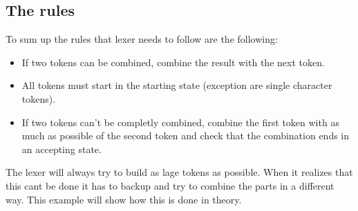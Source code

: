 \subsection{The rules}
To sum up the rules that lexer needs to follow are the following:
\begin{itemize}
\item If two tokens can be combined, combine the result with the next token.
\item All tokens must start in the starting state (exception are single
character tokens).
\item If two tokens can't be completly combined, combine the first token with as
much as possible of the second token and check that the combination ends in an
accepting state.
\end{itemize}
\newpage
\begin{example}
The lexer will always try to build as lage tokens as possible. When it realizes that this cant be done it has to backup and try to combine the parts in a different way. This example will show how this is done in theory. 


\end{example}
